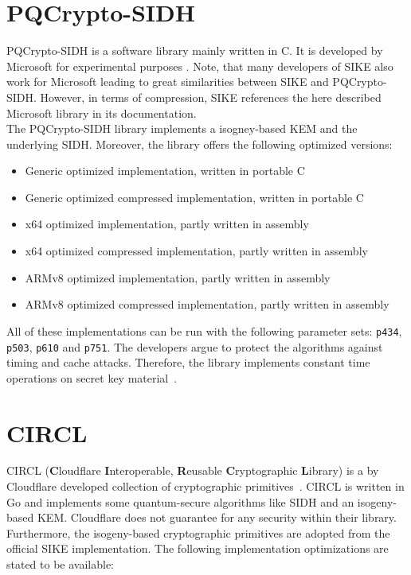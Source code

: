 \section{PQCrypto-SIDH}
PQCrypto-SIDH is a software library mainly written in C. It is developed by Microsoft for experimental purposes \parencite{microsoft2020sidh}. Note, that many developers of SIKE also work for Microsoft leading to great similarities between SIKE and PQCrypto-SIDH. However, in terms of compression, SIKE references  the here described Microsoft library in its documentation.\\
The PQCrypto-SIDH library implements a isogney-based KEM and the underlying SIDH. Moreover, the library offers the following optimized versions:
\begin{itemize}
  \item Generic optimized implementation, written in portable C
  \item Generic optimized compressed implementation, written in portable C
  \item x64 optimized implementation, partly written in assembly
  \item x64 optimized compressed implementation, partly written in assembly
  \item ARMv8 optimized implementation, partly written in assembly
  \item ARMv8 optimized compressed implementation, partly written in assembly
\end{itemize}
All of these implementations can be run with the following parameter sets: \texttt{p434}, \texttt{p503}, \texttt{p610} and \texttt{p751}. The developers argue to protect the algorithms against timing and cache attacks. Therefore, the library implements constant time operations on secret key material~\parencite{microsoft2020sidh}.

\section{CIRCL}

CIRCL (\textbf{C}loudflare \textbf{I}nteroperable, \textbf{R}eusable \textbf{C}ryptographic \textbf{L}ibrary) is a by Cloudflare developed collection of cryptographic primitives~\parencite{circl2020github}. CIRCL is written in Go and implements some quantum-secure algorithms like SIDH and an isogeny-based KEM. Cloudflare does not guarantee for any security within their library. Furthermore, the isogeny-based cryptographic primitives are adopted from the official SIKE implementation. The following implementation optimizations are stated to be available:

